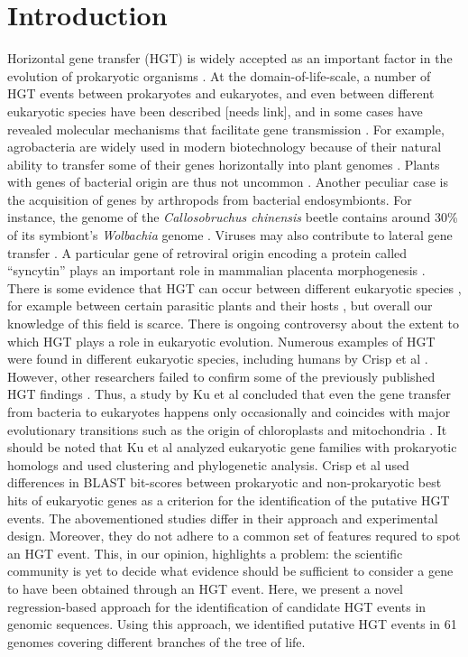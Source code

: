 \section{Introduction}
\label{intro}
Horizontal gene transfer (HGT) is widely accepted as an important factor in the
evolution of prokaryotic organisms \cite{Ochman2000}. At the
domain-of-life-scale, a number of HGT events between prokaryotes and
eukaryotes, and even between different eukaryotic species have been described
[needs link], and in some cases have revealed molecular mechanisms that
facilitate gene transmission \cite{Soucy2015}. For example, agrobacteria are
widely used in modern biotechnology because of their natural ability to
transfer some of their genes horizontally into plant genomes
\cite{Chilton1977}. Plants with genes of bacterial origin are thus not uncommon
\cite{Kyndt2015, Matveeva2012, Matveeva2014}. Another peculiar case is the
acquisition of genes by arthropods from bacterial endosymbionts. For instance,
the genome of the \textit{Callosobruchus chinensis} beetle contains around 30\%
of its symbiont's \textit{Wolbachia} genome \cite{Nikoh2008}. Viruses may also
contribute to lateral gene transfer \cite{Drezen2017}. A particular gene of
retroviral origin encoding a protein called ``syncytin'' plays an important
role in mammalian placenta morphogenesis \cite{Mi2000}. There is some evidence
that HGT can occur between different eukaryotic species \cite{Soucy2015}, for
example between certain parasitic plants and their hosts \cite{Yoshida2010,
Xi2012, Zhang2013, Zhang2014}, but overall our knowledge of this field is
scarce. There is ongoing controversy about the extent to which HGT plays a role
in eukaryotic evolution. Numerous examples of HGT were found in different
eukaryotic species, including humans by Crisp et al \cite{Crisp2015}. However,
other researchers failed to confirm some of the previously published HGT
findings \cite{Salzberg2017}. Thus, a study by Ku et al concluded that even
the gene transfer from bacteria to eukaryotes happens only occasionally and
coincides with major evolutionary transitions such as the origin of
chloroplasts and mitochondria \cite{Ku2015}. It should be noted that Ku et al
analyzed eukaryotic gene families with prokaryotic homologs and used clustering
and phylogenetic analysis. Crisp et al used differences in BLAST bit-scores
between prokaryotic and non-prokaryotic best hits of eukaryotic genes as a
criterion for the identification of the putative HGT events. The abovementioned
studies differ in their approach and experimental design. Moreover, they do not
adhere to a common set of features requred to spot an HGT event. This, in our
opinion, highlights a problem: the scientific community is yet to decide what
evidence should be sufficient to consider a gene to have been obtained
through an HGT event. Here, we present a novel regression-based approach for
the identification of candidate HGT events in genomic sequences. Using this
approach, we identified putative HGT events in 61 genomes covering different
branches of the tree of life.
